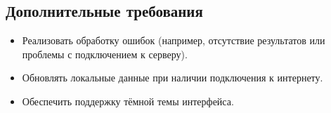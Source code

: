 \subsection{Дополнительные требования}
\begin{itemize}
    \item Реализовать обработку ошибок (например, отсутствие результатов или проблемы с подключением к серверу).
    \item Обновлять локальные данные при наличии подключения к интернету.
    \item Обеспечить поддержку тёмной темы интерфейса.
\end{itemize}
